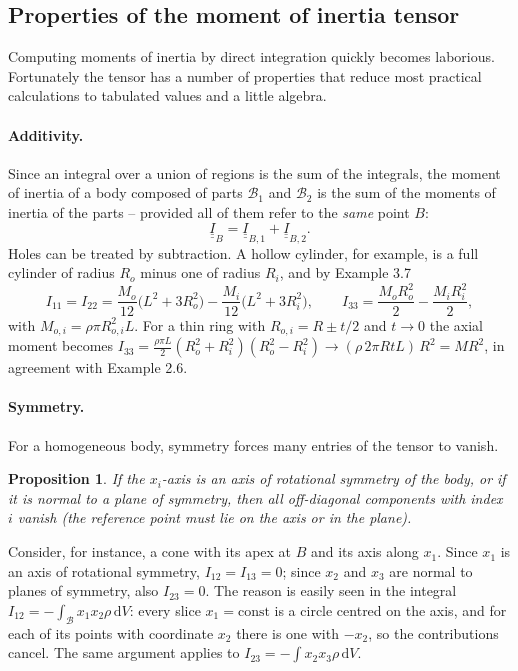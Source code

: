 \documentclass[11pt,a4paper,oneside]{report}
\numberwithin{equation}{chapter}
\newcommand{\tens}[1]{\underline{\underline{#1}}}
\newcommand{\dd}{\,\mathrm{d}}
\theoremstyle{plain}
\newtheorem{proposition}[theorem]{Proposition}
\theoremstyle{definition}
\theoremstyle{remark}
\newcommand{\lecture}[2]{\marginpar{\raggedright\footnotesize\textsc{Lecture #1}\\\textit{#2}}}
\begin{document}
\subsection{Properties of the moment of inertia tensor}
\lecture{11}{21.10.2026}
Computing moments of inertia by direct integration quickly becomes laborious. Fortunately the tensor has a number of
properties that reduce most practical calculations to tabulated values and a little algebra.

\paragraph{Additivity.}
Since an integral over a union of regions is the sum of the integrals, the moment of inertia of a body composed of parts
$\mathcal B_1$ and $\mathcal B_2$ is the sum of the moments of inertia of the parts -- provided all of them refer to the
\emph{same} point $B$:
\begin{equation}
  \tens I_B=\tens I_{B,1}+\tens I_{B,2}.
\end{equation}
Holes can be treated by subtraction. A hollow cylinder, for example, is a full cylinder of radius $R_o$ minus one of
radius $R_i$, and by Example 3.7
\[
  I_{11}=I_{22}=\frac{M_o}{12}\big(L^2+3R_o^2\big)-\frac{M_i}{12}\big(L^2+3R_i^2\big),\qquad
  I_{33}=\frac{M_oR_o^2}{2}-\frac{M_iR_i^2}{2},
\]
with $M_{o,i}=\rho\pi R_{o,i}^2L$. For a thin ring with $R_{o,i}=R\pm t/2$ and $t\to0$ the axial moment becomes
$I_{33}=\frac{\rho\pi L}{2}(R_o^2+R_i^2)(R_o^2-R_i^2)\to(\rho\,2\pi RtL)\,R^2=MR^2$, in agreement with Example 2.6.

\paragraph{Symmetry.}
For a homogeneous body, symmetry forces many entries of the tensor to vanish.
\begin{proposition}
If the $x_i$-axis is an axis of rotational symmetry of the body, or if it is normal to a plane of symmetry, then all
off-diagonal components with index $i$ vanish (the reference point must lie on the axis or in the plane).
\end{proposition}
Consider, for instance, a cone with its apex at $B$ and its axis along $x_1$. Since $x_1$ is an axis of rotational
symmetry, $I_{12}=I_{13}=0$; since $x_2$ and $x_3$ are normal to planes of symmetry, also $I_{23}=0$. The reason is
easily seen in the integral $I_{12}=-\int_{\mathcal B}x_1x_2\rho\dd V$: every slice $x_1=\text{const}$ is a circle centred
on the axis, and for each of its points with coordinate $x_2$ there is one with $-x_2$, so the contributions cancel.
The same argument applies to $I_{23}=-\int x_2x_3\rho\dd V$.
\end{document}

